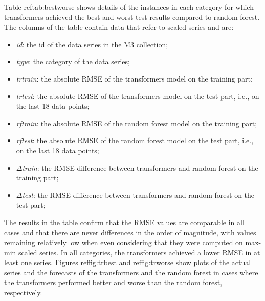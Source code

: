 \documentclass[algorithms,article,submit,pdftex,moreauthors]{Definitions/mdpi}
\begin{document}
Table ref{tab:bestworse} shows details of the instances in each category for which transformers achieved the best and worst test results compared to random forest. The columns of the table contain data that refer to scaled series and are:
\begin{itemize}
	\item {\it id}: the id of the data series in the M3 collection;
	\item {\it type}: the category of the data series;
	\item {\it trtrain}: the absolute RMSE of the transformers model on the training part;
	\item {\it trtest}: the absolute RMSE of the transformers model on the test part, i.e., on the last 18 data points;
	\item {\it rftrain}: the absolute RMSE of the random forest model on the training part;
	\item {\it rftest}: the absolute RMSE of the random forest model on the test part, i.e., on the last 18 data points;
	\item {\it $\Delta$train}: the RMSE difference between transformers and random forest on the training part;
	\item {\it $\Delta$test}: the RMSE difference between transformers and random forest on the test part;
\end{itemize}

The results in the table confirm that the RMSE values are comparable in all cases and that there are never differences in the order of magnitude, with values remaining relatively low when even considering that they were computed on max-min scaled series. In all categories, the transformers achieved a lower RMSE in at least one series. Figures ref{fig:trbest} and ref{fig:trworse} show plots of the actual series and the forecasts of the transformers and the random forest in cases where the transformers performed better and worse than the random forest, respectively.
\end{document}
